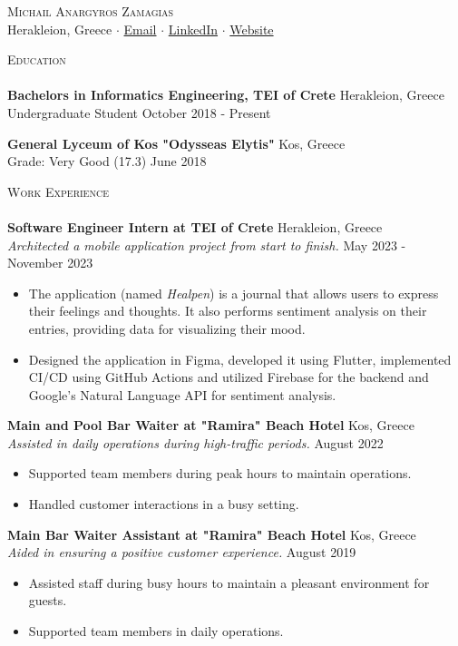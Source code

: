 \documentclass[a4paper, 11pt]{article}
\newcommand{\lineunder} {
	\vspace*{-8pt} \\
	\hspace*{-18pt} \hrulefill \\
}
\newcommand{\header} [1] {
	\vspace*{2mm}
	{\hspace*{-18pt}\vspace*{6pt} \textsc{#1}}
	\vspace*{-6pt} \lineunder
}
\newcommand{\education}[4]{ %
	\textbf{#1} \hfill #3 \\ %
	#2 \hfill #4 \\ %
	\vspace*{2mm}
}
\newcommand{\workexperience}[5]{ %
	\textbf{#1} \hfill #2 \\ %
	\textit{#3} \hfill #4 \\ %
	#5 %
	\vspace*{2mm}
}
\newcommand{\socialmediabutton}[2]{%
	\href{#1}{#2}
}
\begin{document}
\vspace*{-40pt}


\begin{center}
	{\Huge \scshape {Michail Anargyros Zamagias}}\\
	Herakleion, Greece $\cdot$ \socialmediabutton{mailto:contact@mikezamayias.com}{Email} $\cdot$ \socialmediabutton{https://linkedin.com/in/mikezamayias}{LinkedIn} $\cdot$ \socialmediabutton{https://mikezamayias.com}{Website}
\end{center}


\header{Education}
\education
{Bachelors in Informatics Engineering, TEI of Crete}
{Undergraduate Student}
{Herakleion, Greece}
{October 2018 -  Present}
\education
{General Lyceum of Kos "Odysseas Elytis"}
{Grade: Very Good (17.3)}
{Kos, Greece}
{June 2018}


\header{Work Experience}
\workexperience
{Software Engineer Intern at TEI of Crete}
{Herakleion, Greece}
{Architected a mobile application project from start to finish.}
{May 2023 - November 2023}
{
	\begin{itemize} \itemsep 1pt
		\item The application (named \textit{Healpen}) is a journal that allows users to express their feelings and thoughts. It also performs sentiment analysis on their entries, providing data for visualizing their mood.
		\item Designed the application in Figma, developed it using Flutter, implemented CI/CD using GitHub Actions and utilized Firebase for the backend and Google's Natural Language API for sentiment analysis.
	\end{itemize}
}
\workexperience
{Main and Pool Bar Waiter at "Ramira" Beach Hotel}
{Kos, Greece}
{Assisted in daily operations during high-traffic periods.}
{August 2022}
{
	\begin{itemize} \itemsep 1pt
		\item Supported team members during peak hours to maintain operations.
		\item Handled customer interactions in a busy setting.
	\end{itemize}
}
\workexperience
{Main Bar Waiter Assistant at "Ramira" Beach Hotel}
{Kos, Greece}
{Aided in ensuring a positive customer experience.}
{August 2019}
{
	\begin{itemize} \itemsep 1pt
		\item Assisted staff during busy hours to maintain a pleasant environment for guests.
		\item Supported team members in daily operations.
	\end{itemize}
}
\end{document}
